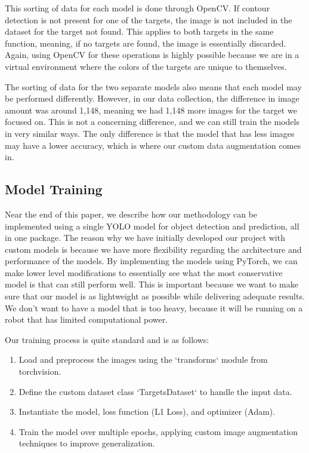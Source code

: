 

This sorting of data for each model is done through OpenCV. If contour detection is not present for one of the targets, the image is not included in the dataset for the target not found. This applies to both targets in the same function, meaning, if no targets are found, the image is essentially discarded. Again, using OpenCV for these operations is highly possible because we are in a virtual environment where the colors of the targets are unique to themselves.

The sorting of data for the two separate models also means that each model may be performed differently. However, in our data collection, the difference in image amount was around 1,148, meaning we had 1,148 more images for the target we focused on. This is not a concerning difference, and we can still train the models in very similar ways. The only difference is that the model that has less images may have a lower accuracy, which is where our custom data augmentation comes in.

\subsection{Model Training}
Near the end of this paper, we describe how our methodology can be implemented using a single YOLO model for object detection and prediction, all in one package. The reason why we have initially developed our project with custom models is because we have more flexibility regarding the architecture and performance of the models. By implementing the models using PyTorch, we can make lower level modifications to essentially see what the most conservative model is that can still perform well. This is important because we want to make sure that our model is as lightweight as possible while delivering adequate results. We don't want to have a model that is too heavy, because it will be running on a robot that has limited computational power.

Our training process is quite standard and is as follows:
\begin{enumerate}
    \item Load and preprocess the images using the `transforms` module from torchvision.
    \item Define the custom dataset class `TargetsDataset` to handle the input data.
    \item Instantiate the model, loss function (L1 Loss), and optimizer (Adam).
    \item Train the model over multiple epochs, applying custom image augmentation techniques to improve generalization.
\end{enumerate}

